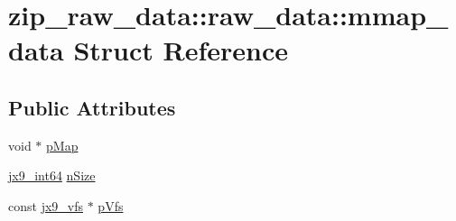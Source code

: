 \hypertarget{structzip__raw__data_1_1raw__data_1_1mmap__data}{\section{zip\-\_\-raw\-\_\-data\-:\-:raw\-\_\-data\-:\-:mmap\-\_\-data Struct Reference}
\label{d0/d58/structzip__raw__data_1_1raw__data_1_1mmap__data}
}
\subsection*{Public Attributes}
\begin{DoxyCompactItemize}
\item 
void $\ast$ \hyperlink{structzip__raw__data_1_1raw__data_1_1mmap__data_a9e4edea7d7507af12297e864453db6d3}{p\-Map}
\item 
\hyperlink{unqlite_8c_aeaac5ecf324354b1c4bb9f6559bab7af}{jx9\-\_\-int64} \hyperlink{structzip__raw__data_1_1raw__data_1_1mmap__data_ac49936b557475026b7c18b330f0095cc}{n\-Size}
\item 
const \hyperlink{structjx9__vfs}{jx9\-\_\-vfs} $\ast$ \hyperlink{structzip__raw__data_1_1raw__data_1_1mmap__data_a2d11521c7e9b136952c30d9940024ff9}{p\-Vfs}
\end{DoxyCompactItemize}


